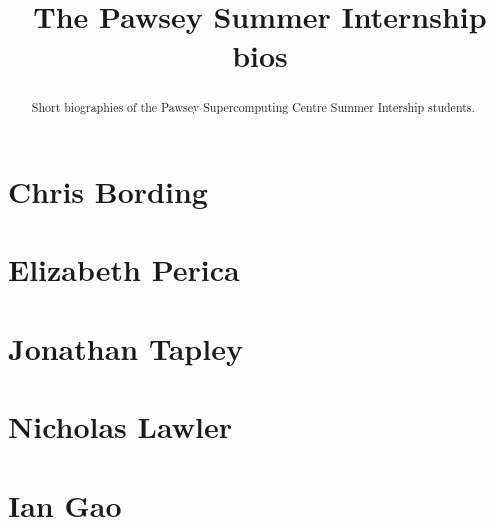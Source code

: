 \documentclass[11pt,a4paper]{report}
\title{The Pawsey Summer Internship bios}
\begin{document}
\maketitle
\tableofcontents


\begin{abstract}

Short biographies of the Pawsey Supercomputing Centre Summer Intership students.

\end{abstract}

\chapter{Chris Bording}


\chapter{Elizabeth Perica}




\chapter{Jonathan Tapley}


\chapter{Nicholas Lawler}


\chapter{Ian Gao}

\end{document}
